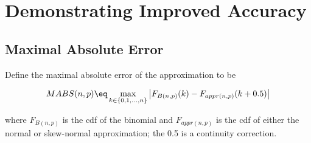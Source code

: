 \documentclass{article}
\begin{document}
\section{Demonstrating Improved Accuracy}

\subsection{Maximal Absolute Error}

Define the maximal absolute error of the approximation to be

\begin{equation}
  MABS(n, p) \eq \max_{k \in \{0, 1,...,n\}} \left| F_{B(n,p)} (k) -  F_{appr(n,p)}(k + 0.5) \right|
\end{equation}

where $F_{B(n,p)}$ is the cdf of the binomial and $F_{appr(n,p)}$ is the cdf of
either the normal or skew-normal approximation; the 0.5 is a continuity
correction.
\end{document}

